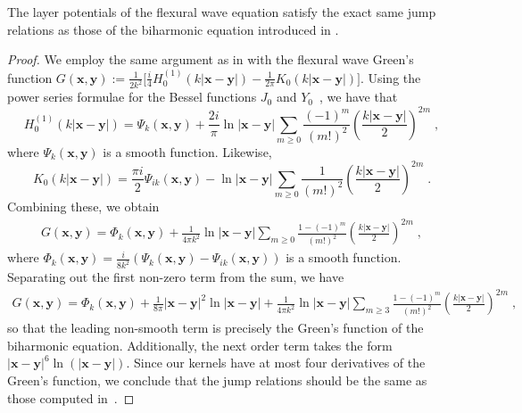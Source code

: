 \documentclass[preprint,12pt,3p]{elsarticle}
\begin{document}
\begin{lem}
    The layer potentials of the flexural wave equation satisfy the exact same jump relations as those of the biharmonic equation introduced in \cite{farkas}.
\end{lem}
\begin{proof}
    We employ the same argument as in \cite{Lindsay2018} with the flexural wave Green's function $G(\mathbf{x},\mathbf{y}) :=  \displaystyle\frac{1}{2k^2} \bigg[\frac{i}{4} H_0^{(1)} (k |\mathbf{x} - \mathbf{y}|) - \frac{1}{2\pi} K_0 (k | \mathbf{x} - \mathbf{y}|) \bigg]$. 
Using the power series formulae for the Bessel functions $J_0$ and $Y_0$~\cite[\S 10.8]{NIST}, we have that 
\begin{equation}
H_0^{(1)} (k |\mathbf{x} - \mathbf{y}|) = \Psi_k(\mathbf{x},\mathbf{y}) + \frac{2i}{\pi} \ln|\mathbf{x}-\mathbf{y}| \sum_{m\geq 0} 
\frac{(-1)^m}{(m!)^2} \left(\frac{k|\mathbf{x}-\mathbf{y}|}{2}\right)^{2m} \; ,
\end{equation}
where $\Psi_k(\mathbf{x},\mathbf{y})$ is a smooth function. Likewise, 
\begin{equation}
 K_0 (k |\mathbf{x} - \mathbf{y}|) = \frac{\pi i}{2} \Psi_{ik}(\mathbf{x},\mathbf{y}) - \ln|\mathbf{x}-\mathbf{y}| \sum_{m\geq 0} 
 \frac{1}{(m!)^2} \left(\frac{k|\mathbf{x}-\mathbf{y}|}{2}\right)^{2m} \; .
\end{equation}
Combining these, we obtain  
\begin{align}
 G(\mathbf{x},\mathbf{y}) =  \Phi_{k}(\mathbf{x},\mathbf{y}) + \frac{1}{4\pi k^2}\ln|\mathbf{x}-\mathbf{y}| \sum_{m\geq 0} 
 \frac{1-(-1)^m}{(m!)^2} \left(\frac{k|\mathbf{x}-\mathbf{y}|}{2}\right)^{2m} \; ,
\end{align}
where $\Phi_k(\mathbf{x},\mathbf{y}) = \frac{i}{8k^2}( \Psi_k(\mathbf{x},\mathbf{y}) - \Psi_{ik}(\mathbf{x},\mathbf{y}))$ is
a smooth function. Separating out the first non-zero term from the sum, we have 
\begin{align}
  \label{eq:gseries}
 G(\mathbf{x},\mathbf{y}) =  \Phi_{k}(\mathbf{x},\mathbf{y}) + \frac{1}{8\pi} |\mathbf{x}-\mathbf{y}|^2 \ln|\mathbf{x}-\mathbf{y}| + \frac{1}{4\pi k^2}\ln|\mathbf{x}-\mathbf{y}| \sum_{m\geq 3} 
 \frac{1-(-1)^m}{(m!)^2} \left(\frac{k|\mathbf{x}-\mathbf{y}|}{2}\right)^{2m} \; ,
\end{align}
so that the leading non-smooth term is precisely the Green's function of the biharmonic equation. Additionally, the next order term takes the form $|\mathbf{x}-\mathbf{y}|^6 \ln(|\mathbf{x}-\mathbf{y}|)$. Since our kernels have at most four derivatives of the Green's function, we conclude that the jump relations should be the same as those computed in~\cite{farkas}.
\end{proof}
\end{document}
